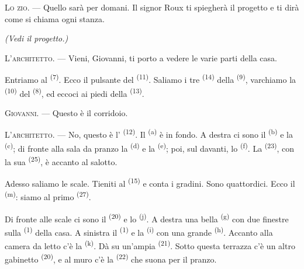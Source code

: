 \textsc{Lo zio}. --- Quello sarà per domani. Il signor Roux ti spiegherà il progetto e
ti dirà come si chiama ogni stanza.

\VUsaut{3.0mm}
\VUsaut{2.4mm}

{\centering\textit{(Vedi il progetto.)}\par}
\VUsaut{2.4mm}

\textsc{L'architetto}. --- Vieni, Giovanni, ti porto a vedere le varie parti della
casa.

Entriamo al  \textsuperscript{(7)}. Ecco il pulsante del
 \textsuperscript{(11)}. Saliamo i tre 
\textsuperscript{(14)} della  \textsuperscript{(9)}, varchiamo la
 \textsuperscript{(10)} del  \textsuperscript{(8)}, ed
eccoci ai piedi della  \textsuperscript{(13)}.

\textsc{Giovanni}. --- Questo è il corridoio.

\textsc{L'architetto}. --- No, questo è l' \textsuperscript{(12)}. Il
 \textsuperscript{(a)} è in fondo. A destra ci sono il
 \textsuperscript{(b)} e la 
\textsuperscript{(c)}; di fronte alla sala da pranzo la 
\textsuperscript{(d)} e la  \textsuperscript{(e)}; poi, sul davanti,
lo  \textsuperscript{(f)}. La 
\textsuperscript{(23)}, con la sua  \textsuperscript{(25)}, è
accanto al salotto.

Adesso saliamo le scale. Tieniti al  \textsuperscript{(15)} e conta i
gradini. Sono quattordici. Ecco il  \textsuperscript{(m)}: siamo
al primo  \textsuperscript{(27)}.

\VUsaut{3.0mm}
\VUsaut{3.0mm}

Di fronte alle scale ci sono il  \textsuperscript{(20)} e lo
 \textsuperscript{(j)}. A destra una bella  \textsuperscript{(g)} con due finestre sulla 
\textsuperscript{(1)} della casa. A sinistra il  \textsuperscript{(1)} e
la  \textsuperscript{(i)} con una grande
 \textsuperscript{(h)}. Accanto alla camera da letto c'è la
 \textsuperscript{(k)}. Dà su un'ampia 
\textsuperscript{(21)}. Sotto questa terrazza c'è un altro gabinetto
\textsuperscript{(20)}, e al muro c'è la  \textsuperscript{(22)} che
suona per il pranzo.

